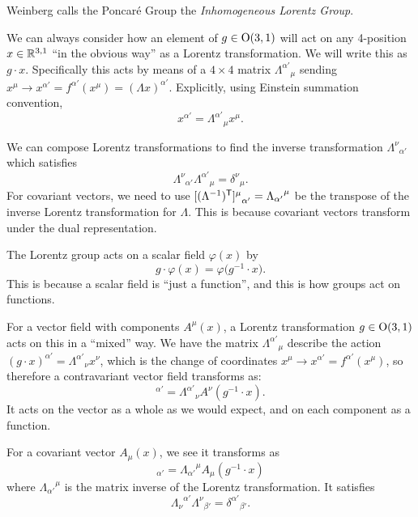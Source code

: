 \begin{remark}
Weinberg calls the Poncar\'e Group the \emph{Inhomogeneous Lorentz Group}.
\end{remark}

\M
We can always consider how an element of $g\in\mathrm{O}(3,1)$ will act on any
4-position $x\in\mathbb{R}^{3,1}$ ``in the obvious way'' as a Lorentz
transformation. We will write this as $g\cdot x$. Specifically this acts
by means of a $4\times4$ matrix ${\Lambda^{\alpha'}}_{\mu}$ sending
$x^{\mu}\to x^{\alpha'} = f^{\alpha'}(x^{\mu}) = (\Lambda x)^{\alpha'}$.
Explicitly, using Einstein summation convention,
\begin{equation*}
x^{\alpha'} = {\Lambda^{\alpha'}}_{\mu}x^{\mu}.
\end{equation*}

We can compose Lorentz transformations to find the inverse
transformation ${\Lambda^{\nu}}_{\alpha'}$ which satisfies
\begin{equation}
{\Lambda^{\nu}}_{\alpha'}{\Lambda^{\alpha'}}_{\mu}={\delta^{\nu}}_{\mu}.
\end{equation}
For covariant vectors, we need to use
${[(\Lambda^{-1})^{\mathsf{T}}]^{\mu}}_{\alpha'} = {\Lambda_{\alpha'}}^{\mu}$
be the transpose of the inverse Lorentz transformation for $\Lambda$.
This is because covariant vectors transform under the dual
representation. 


\M
The Lorentz group acts on a scalar field $\varphi(x)$ by
\begin{equation}
g\cdot\varphi(x) = \varphi\bigl(g^{-1}\cdot x\bigr).
\end{equation}
This is because a scalar field is ``just a function'', and this is how
groups act on functions.

For a vector field with components $A^{\mu}(x)$, a Lorentz
transformation $g\in\mathrm{O}(3,1)$ acts on this in a ``mixed'' way. We have
the matrix ${\Lambda^{\alpha'}}_{\mu}$ describe the action $(g\cdot x)^{\alpha'} = {\Lambda^{\alpha'}}_{\nu}x^{\nu}$,
which is the change of coordinates $x^{\mu}\to x^{\alpha'}=f^{\alpha'}(x^{\mu})$,
so therefore a contravariant vector field transforms as:
\begin{equation}
[(g\cdot \vec{A})(x)]^{\alpha'} = {\Lambda^{\alpha'}}_{\nu}A^{\nu}(g^{-1}\cdot x).
\end{equation}
It acts on the vector as a whole as we would expect, and on each
component as a function.

For a covariant vector $A_{\mu}(x)$, we see it transforms as
\begin{equation}
[(g\cdot \vec{A})(x)]_{\alpha'} = {\Lambda_{\alpha'}}^{\mu}A_{\mu}(g^{-1}\cdot x)
\end{equation}
where ${\Lambda_{\alpha'}}^{\mu}$ is the matrix inverse of the Lorentz
transformation. It satisfies
\begin{equation}
{\Lambda_{\nu}}^{\alpha'}{\Lambda^{\nu}}_{\beta'} = {\delta^{\alpha'}}_{\beta'}.
\end{equation}

